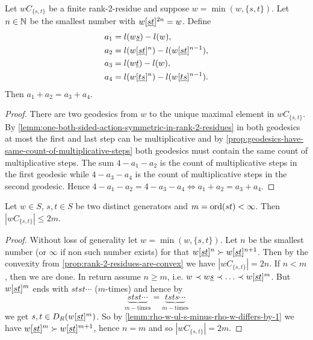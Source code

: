 \begin{coro}

	Let $wC_{\{s,t\}}$ be a finite rank-2-residue and suppose $w = \min(w,\{s,t\})$. Let $n \in \mathbb{N}$ be the smallest number with $w[\underline{s} \underline{t}]^{2n} = w$. Define
	\begin{align*}
		a_1 & = l(w \underline{s}) - l(w), \\
		a_2 & = l(w[\underline{s} \underline{t}]^{n}) - l(w[\underline{s} \underline{t}]^{n-1}), \\
		a_3 & = l(w \underline{t}) - l(w), \\
		a_4 & = l(w[\underline{t} \underline{s}]^{n}) - l(w[\underline{t} \underline{s}]^{n-1}).
	\end{align*}
	Then $a_1 + a_2 = a_3 + a_4$.

	\begin{proof}
		There are two geodesics from $w$ to the unique maximal element in $wC_{\{s,t\}}$. By \ref{lemm:one-both-sided-action-symmetric-in-rank-2-residues} in both geodesics at most the first and last step can be multiplicative and by \ref{prop:geodesics-have-same-count-of-multiplicative-steps} both geodesics must contain the same count of multiplicative steps. The sum $4-a_1-a_2$ is the count of multiplicative steps in the first geodesic while $4-a_3-a_4$ is the count of multiplicative steps in the second geodesic. Hence $4-a_1-a_2 = 4-a_3-a_4 \iff a_1+a_2 = a_3+a_4$.
	\end{proof}
\end{coro}

\begin{lemm}
	Let $w \in S$, $s,t \in S$ be two distinct generators and $m = \operatorname{ord}(st) < \infty$. Then $|wC_{\{s,t\}}| \leq 2m$.

	\begin{proof}
		Without loss of generality let $w = \min(w,\{s,t\})$. Let $n$ be the smallest number (or $\infty$ if non such number exists) for that $w[\underline{s} \underline{t}]^{n} \succ w[\underline{s} \underline{t}]^{n+1}$. Then by the convexity from \ref{prop:rank-2-residues-are-convex} we have $|wC_{\{s,t\}}| = 2n$. If $n < m$, then we are done. In return assume $n \geq m$, i.e. $w \prec w \underline{s} \prec \ldots \prec w[\underline{s} \underline{t}]^{m}$. But $w[\underline{s} \underline{t}]^{m}$ ends with $stst \cdots$ ($m$-times) and hence by
		$$ \underbrace{stst \cdots}_{m-\textrm{times}} = \underbrace{tsts \cdots}_{m-\textrm{times}} $$
		we get $s,t \in D_R(w[\underline{s} \underline{t}]^{m})$. So by \ref{lemm:rho-w-ul-s-minus-rho-w-differs-by-1} we have $w[\underline{s} \underline{t}]^{m} \succ w[\underline{s} \underline{t}]^{m+1}$, hence $n = m$ and so $|wC_{\{s,t\}}| = 2m$.
	\end{proof}
\end{lemm}

